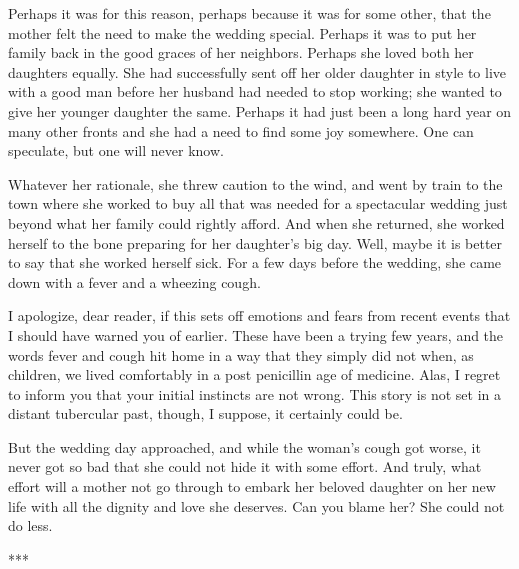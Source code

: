 \documentclass{amsart}
\begin{document}
Perhaps it was for this reason, perhaps because it was for some other, that the mother felt the need to make the wedding special. Perhaps it was to put her family back in the good graces of her neighbors. Perhaps she loved both her daughters equally. She had successfully sent off her older daughter in style to live with a good man before her husband had needed to stop working; she wanted to give her younger daughter the same. Perhaps it had just been a long hard year on many other fronts and she had a need to find some joy somewhere. One can speculate, but one will never know. 

Whatever her rationale, she threw caution to the wind, and went by train to the town where she worked to buy all that was needed for a spectacular wedding just beyond what her family could rightly afford. And when she returned, she worked herself to the bone preparing for her daughter's big day. Well, maybe it is better to say that she worked herself sick. For a few days before the wedding, she came down with a fever and a wheezing cough. 

I apologize, dear reader, if this sets off emotions and fears from recent events that I should have warned you of earlier. These have been a trying few years, and the words fever and cough hit home in a way that they simply did not when, as children, we lived comfortably in a post penicillin age of medicine. Alas, I regret to inform you that your initial instincts are not wrong. This story is not set in a distant tubercular past, though, I suppose, it certainly could be.

But the wedding day approached, and while the woman's cough got worse, it never got so bad that she could not hide it with some effort. And truly, what effort will a mother not go through to embark her beloved daughter on her new life with all the dignity and love she deserves. Can you blame her? She could not do less. 

\begin{center} *** \end{center}
\end{document}
